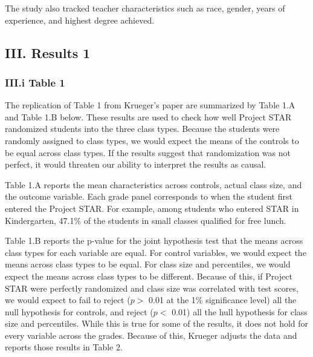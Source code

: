 \documentclass[a4paper,11pt]{article}
\begin{document}
The study also tracked teacher characteristics such as race, gender, years of experience, and highest degree achieved. \\

\subsection*{III. Results 1}

\subsubsection*{III.i Table 1}
The replication of Table 1 from Krueger's paper are summarized by Table 1.A and Table 1.B below. These results are used to check how well Project STAR randomized students into the three class types. Because the students were randomly assigned to class types, we would expect the means of the controls to be equal across class types. If the results suggest that randomization was not perfect, it would threaten our ability to interpret the results as causal.
 \par

Table 1.A reports the mean characteristics across controls, actual class size, and the outcome variable. Each grade panel corresponds to when the student first entered the Project STAR. For example, among students who entered STAR in Kindergarten, 47.1\% of the students in small classes qualified for free lunch. \par

Table 1.B reports the p-value for the joint hypothesis test that the means across class types for each variable are equal. For control variables, we would expect the means across class types to be equal. For class size and percentiles, we would expect the means across class types to be different. Because of this, if Project STAR were perfectly randomized and class size was correlated with test scores, we would expect to fail to reject ($p >$ 0.01 at the 1\% significance level) all the null hypothesis for controls, and reject ($p <$ 0.01) all the hull hypothesis for class size and percentiles. While this is true for some of the results, it does not hold for every variable across the grades. Because of this, Krueger adjusts the data and reports those results in Table 2. \par
\end{document}
